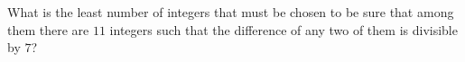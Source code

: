 What is the least number of integers that must be chosen to be sure that among them there are $11$ integers such that the difference of any two of them is divisible by $7$?
